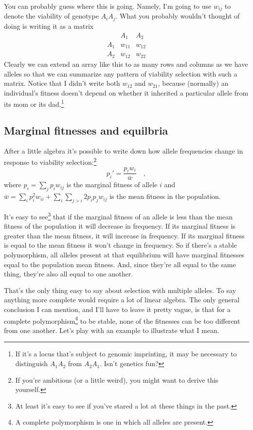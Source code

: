 \noindent You can probably guess where this is going. Namely, I'm
going to use $w_{ij}$ to denote the viability of genotype
$A_iA_j$. What you probably wouldn't thought of doing is writing it as
a matrix
\[
\begin{array}{ccc}
    & A_1  & A_2 \\
A_1 & w_{11} & w_{12} \\
A_2 & w_{12} & w_{22}
\end{array}
\]
Clearly we can extend an array like this to as many rows and columns
as we have alleles so that we can summarize any pattern of viability
selection with such a matrix. Notice that I didn't write both $w_{12}$
and $w_{21}$, because (normally) an individual's fitness doesn't
depend on whether it inherited a particular allele from its mom or its
dad.\footnote{If it's a locus that's subject to genomic imprinting, it
  may be necessary to distinguish $A_1A_2$ from $A_2A_1$. Isn't
  genetics fun?}

\subsection*{Marginal fitnesses and
  equilbria}

After a little algebra it's possible to write down how allele
frequencies change in response to viability selection:\footnote{If
  you're ambitious (or a little weird), you might want to derive this
  yourself.}
\[
p_i' = \frac{p_iw_i}{\bar w} \quad ,
\]
where $p_i = \sum_j p_i w_{ij}$ is the marginal fitness of allele $i$ and
$\bar w = \sum_i p_i^2 w_{ii} + \sum_i\sum_{j>i} 2p_ip_jw_{ij}$ is the
mean fitness in the population.

It's easy to see\footnote{At least it's easy to see if you've stared a
  lot at these things in the past.} that if the marginal fitness of an
allele is less than the mean fitness of the population it will
decrease in frequency. If its marginal fitness is greater than the
mean fitness, it will increase in frequency.  If its marginal fitness
is equal to the mean fitness it won't change in frequency. So if
there's a stable polymorphism, all alleles present at that equilibrium
will have marginal fitnesses equal to the population mean
fitness. And, since they're all equal to the same thing, they're also
all equal to one another.

That's the only thing easy to say about selection with multiple
alleles. To say anything more complete would require a lot of linear
algebra. The only general conclusion I can mention, and I'll have to
leave it pretty vague, is that for a complete polymorphism\footnote{A
complete polymorphism is one in which all alleles are present.} to be
stable, none of the fitnesses can be too different from one
another. Let's play with an example to illustrate what I mean.

